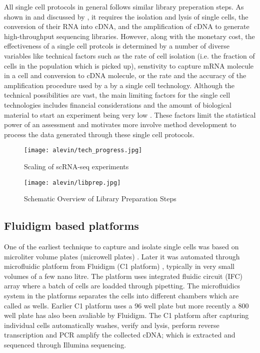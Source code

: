 All single cell protocols in general follows similar library preperation steps. As shown in  and discussed by \citep{ziegenhain2017comparative}, it requires the isolation and lysis of single cells, the conversion of their RNA into cDNA, and the amplification of cDNA to generate high-throughput sequencing libraries. However, along with the monetary cost, the effectiveness of a single cell protcols is determined by a number of diverse variables like technical factors such as the rate of cell isolation (i.e. the fraction of cells in the population which is picked up), senstivity to capture mRNA molecule in a cell and conversion to cDNA molecule, or the rate and the accuracy of the amplification procedure used by a by a single cell technology. Although the technical possibilities are vast, the main limiting factors for the single cell technologies includes financial considerations and the amount of biological material to start an experiment being very low \citep{vieth2017powsimr, ziegenhain2017comparative}. These factors limit the statistical power of an assessment and motivates more involve method development to process the data generated through these single cell protocols.



\begin{figure*}
 \centering
 \texttt{[image: alevin/tech\_progress.jpg]}
  \caption{Scaling of scRNA-seq experiments \citep{svensson2018exponential}}
  \label{fig:sc-techs}
\end{figure*}

\begin{figure*}
 \centering
 \texttt{[image: alevin/libprep.jpg]}
  \caption{Schematic Overview of Library Preparation Steps \citep{ziegenhain2017comparative}}
  \label{fig:libprep}
\end{figure*}

\subsection{Fluidigm based platforms ~\citep{islam2012highly, hashimshony2012cel}}
\label{intro:fluidigm}

One of the earliest technique to capture and isolate single cells was based on microliter volume plates (microwell plates) \citep{islam2012highly, hashimshony2012cel}. Later it was automated through microfluidic platform from Fluidigm (C1 platform) \citep{islam2014}, typically in very small volumes of a few nano litre. The platform uses integrated fluidic circuit (IFC) array where a batch of cells are loadded through pipetting. The microfluidics system in the platforms separates the cells into different chambers which are called as wells. Earlier C1 platform uses a 96 well plate but more recently a 800 well plate has also been avaliable by Fluidigm. The C1 platform after capturing individual cells automatically washes, verify and lysis, perform reverse transcription and PCR amplify the collected cDNA; which is extracted and sequenced through Illumina sequencing.

